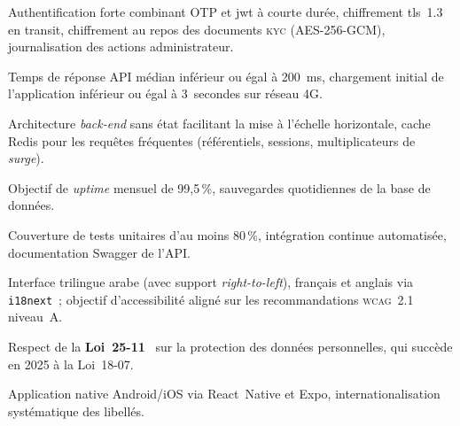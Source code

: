 \documentclass[12pt, a4paper, oneside]{report}
\begin{document}
\begin{nonfuncreq}[title={\textbf{ENF~1 — Sécurité}}]
Authentification forte combinant OTP et \gls{jwt} à courte durée, chiffrement \gls{tls}~1.3 en transit, chiffrement au repos des documents \textsc{kyc} (AES-256-GCM), journalisation des actions administrateur.
\end{nonfuncreq}

\begin{nonfuncreq}[title={\textbf{ENF~2 — Performance}}]
Temps de réponse API médian inférieur ou égal à 200~ms, chargement initial de l'application inférieur ou égal à 3~secondes sur réseau 4G.
\end{nonfuncreq}

\begin{nonfuncreq}[title={\textbf{ENF~3 — Scalabilité}}]
Architecture \textit{back-end} sans état facilitant la mise à l'échelle horizontale, cache Redis pour les requêtes fréquentes (référentiels, sessions, multiplicateurs de \textit{surge}).
\end{nonfuncreq}

\begin{nonfuncreq}[title={\textbf{ENF~4 — Disponibilité}}]
Objectif de \textit{uptime} mensuel de 99{,}5\,\%, sauvegardes quotidiennes de la base de données.
\end{nonfuncreq}

\begin{nonfuncreq}[title={\textbf{ENF~5 — Maintenabilité}}]
Couverture de tests unitaires d'au moins 80\,\%, intégration continue automatisée, documentation Swagger de l'API.
\end{nonfuncreq}

\begin{nonfuncreq}[title={\textbf{ENF~6 — Ergonomie et accessibilité}}]
Interface trilingue arabe (avec support \textit{right-to-left}), français et anglais via \texttt{i18next}~; objectif d'accessibilité aligné sur les recommandations \textsc{wcag}~2.1 niveau~A.
\end{nonfuncreq}

\begin{nonfuncreq}[title={\textbf{ENF~7 — Conformité réglementaire}}]
Respect de la \textbf{Loi~25-11}~\cite{loi2511_2025} sur la protection des données personnelles, qui succède en 2025 à la Loi~18-07.
\end{nonfuncreq}

\begin{nonfuncreq}[title={\textbf{ENF~8 — Compatibilité multiplateforme}}]
Application native Android/iOS via React~Native et Expo, internationalisation systématique des libellés.
\end{nonfuncreq}
\end{document}
